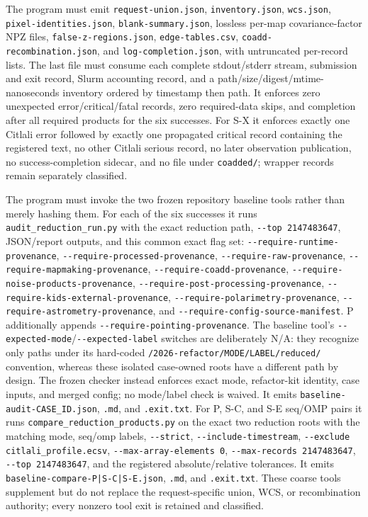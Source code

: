 \documentclass[11pt]{article}
\newcommand{\code}[1]{\nolinkurl{#1}}
\begin{document}
{\raggedright The program must emit \code{request-union.json}, \code{inventory.json},
\code{wcs.json}, \code{pixel-identities.json}, \code{blank-summary.json},
lossless per-map covariance-factor NPZ files, \code{false-z-regions.json},
\code{edge-tables.csv}, \code{coadd-recombination.json}, and
\code{log-completion.json}, with untruncated per-record lists.  The last file
must consume each complete stdout/stderr stream, submission and exit record,
Slurm accounting record, and a path/size/digest/mtime-nanoseconds inventory
ordered by timestamp then path.  It enforces zero unexpected
error/critical/fatal records, zero required-data skips, and completion after all
required products for the six successes.  For S-X it enforces exactly one
Citlali error followed by exactly one propagated critical record containing the
registered text, no other Citlali serious record, no later observation
publication, no success-completion sidecar, and no file under \code{coadded/};
wrapper records remain separately classified.\par}

{\raggedright The program must invoke the two frozen repository baseline tools rather than
merely hashing them.  For each of the six successes it runs
\code{audit_reduction_run.py} with the exact reduction path,
\code{--top 2147483647}, JSON/report outputs, and this common exact flag set:
\code{--require-runtime-provenance},
\code{--require-processed-provenance}, \code{--require-raw-provenance},
\code{--require-mapmaking-provenance}, \code{--require-coadd-provenance},
\code{--require-noise-products-provenance},
\code{--require-post-processing-provenance},
\code{--require-kids-external-provenance},
\code{--require-polarimetry-provenance},
\code{--require-astrometry-provenance}, and
\code{--require-config-source-manifest}.  P additionally appends
\code{--require-pointing-provenance}.  The baseline tool's
\code{--expected-mode}/\code{--expected-label} switches are deliberately N/A:
they recognize only paths under its hard-coded
\code{/2026-refactor/MODE/LABEL/reduced/} convention, whereas these isolated
case-owned roots have a different path by design.  The frozen checker instead
enforces exact mode, refactor-kit identity, case inputs, and merged config; no
mode/label check is waived.
It emits \code{baseline-audit-CASE_ID.json}, \code{.md}, and
\code{.exit.txt}.  For P, S-C, and S-E seq/OMP pairs it runs
\code{compare_reduction_products.py} on the exact two reduction roots with the
matching mode, seq/omp labels, \code{--strict},
\code{--include-timestream}, \code{--exclude citlali_profile.ecsv},
\code{--max-array-elements 0}, \code{--max-records 2147483647},
\code{--top 2147483647}, and the registered absolute/relative tolerances.  It
emits \code{baseline-compare-P|S-C|S-E.json}, \code{.md}, and
\code{.exit.txt}.  These coarse tools supplement but do not replace the
request-specific union, WCS, or recombination authority; every nonzero tool exit
is retained and classified.\par}
\end{document}
